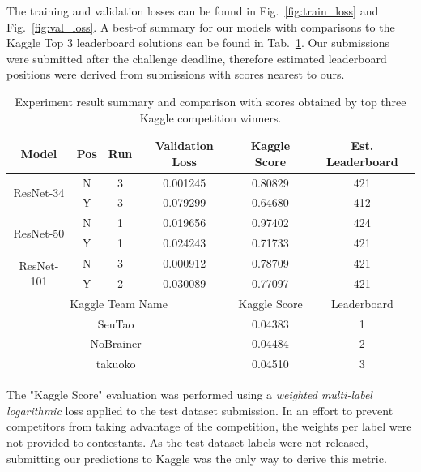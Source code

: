 \documentclass[runningheads]{llncs}
\begin{document}
The training and validation losses can be found in Fig.~\ref{fig:train_loss} and Fig.~\ref{fig:val_loss}.
A best-of summary for our models with comparisons to the Kaggle Top 3 leaderboard solutions can be found in Tab.~\ref{tab:result_summary}.
Our submissions were submitted after the challenge deadline, therefore estimated leaderboard positions were derived from submissions with scores nearest to ours.

\begin{table}[htbp]
    \centering
    \tabcolsep=0.11cm
    \caption{Experiment result summary and comparison with scores obtained by top three Kaggle competition winners.}
    \label{tab:result_summary}
    \begin{tabular}{|c|c|c|c|c|c|}
        \hline
        Model & Pos & Run & Validation Loss & Kaggle Score & Est. Leaderboard \\ \hline
        \multirow{2}{*}{ResNet-34}  & N & 3 & 0.001245 & 0.80829 & 421 \\
                                   & Y & 3 & 0.079299 & 0.64680 & 412 \\
        \multirow{2}{*}{ResNet-50}  & N & 1 & 0.019656 & 0.97402 & 424 \\
                                   & Y & 1 & 0.024243 & 0.71733 & 421 \\
        \multirow{2}{*}{ResNet-101} & N & 3 & 0.000912 & 0.78709 & 421 \\
                                   & Y & 2 & 0.030089 & 0.77097 & 421 \\
        \hline \hline
        \multicolumn{4}{|c|}{Kaggle Team Name} & Kaggle Score & Leaderboard  \\ \hline
        \multicolumn{4}{|c|}{SeuTao~\cite{kaggle/seutao}} & 0.04383 & 1 \\
        \multicolumn{4}{|c|}{NoBrainer~\cite{kaggle/nobrainer}} & 0.04484 & 2 \\
        \multicolumn{4}{|c|}{takuoko~\cite{kaggle/takuoko}} & 0.04510 & 3 \\ \hline
        
    \end{tabular}
\end{table}

The "Kaggle Score" evaluation was performed using a \emph{weighted multi-label logarithmic} loss applied to the test dataset submission.
In an effort to prevent competitors from taking advantage of the competition, the weights per label were not provided to contestants.
As the test dataset labels were not released, submitting our predictions to Kaggle was the only way to derive this metric.
\end{document}

